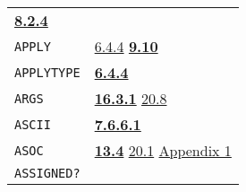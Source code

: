 \documentclass[a4paper,]{article}
\begin{document}
\begin{longtable}[]{@{}ll@{}}
\begin{minipage}[t]{0.70\columnwidth}
\textbf{\href{08-truth.md\#824-object-properties-1}{8.2.4}}\strut
\end{minipage}\tabularnewline
\begin{minipage}[t]{0.24\columnwidth}\raggedright\strut
\texttt{APPLY}\strut
\end{minipage} & \begin{minipage}[t]{0.70\columnwidth}\raggedright\strut
\href{06-data-types.md\#644-printtype-evaltype-and-applytype}{6.4.4}
\textbf{\href{09-functions.md\#910-apply-1}{9.10}}\strut
\end{minipage}\tabularnewline
\begin{minipage}[t]{0.24\columnwidth}\raggedright\strut
\texttt{APPLYTYPE}\strut
\end{minipage} & \begin{minipage}[t]{0.70\columnwidth}\raggedright\strut
\textbf{\href{06-data-types.md\#644-printtype-evaltype-and-applytype}{6.4.4}}\strut
\end{minipage}\tabularnewline
\begin{minipage}[t]{0.24\columnwidth}\raggedright\strut
\texttt{ARGS}\strut
\end{minipage} & \begin{minipage}[t]{0.70\columnwidth}\raggedright\strut
\textbf{\href{16-errors-frames-etc.md\#1631-args}{16.3.1}}
\href{20-coroutines.md\#208-sneakiness-with-processes}{20.8}\strut
\end{minipage}\tabularnewline
\begin{minipage}[t]{0.24\columnwidth}\raggedright\strut
\texttt{ASCII}\strut
\end{minipage} & \begin{minipage}[t]{0.70\columnwidth}\raggedright\strut
\textbf{\href{07-structured-objects.md\#7661-ascii-1}{7.6.6.1}}\strut
\end{minipage}\tabularnewline
\begin{minipage}[t]{0.24\columnwidth}\raggedright\strut
\texttt{ASOC}\strut
\end{minipage} & \begin{minipage}[t]{0.70\columnwidth}\raggedright\strut
\textbf{\href{13-association-properties.md\#134-examining-associations}{13.4}}
\href{20-coroutines.md\#201-process-the-type}{20.1} \href{appendix-1-a-look-inside.md\#basic-data-structures}{Appendix
1}\strut
\end{minipage}\tabularnewline
\begin{minipage}[t]{0.24\columnwidth}\raggedright\strut
\texttt{ASSIGNED?}\strut
\end{minipage} & \begin{minipage}[t]{0.70\columnwidth}\raggedright\strut

\end{minipage}
\end{longtable}
\end{document}
